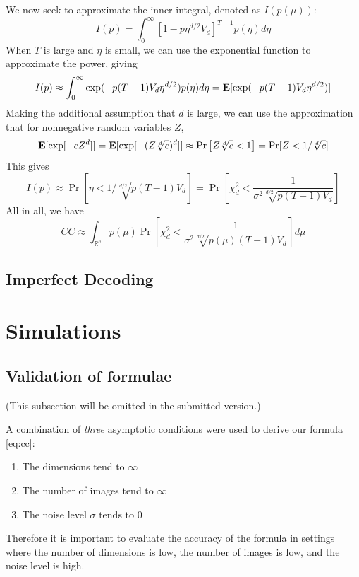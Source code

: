 \documentclass[11pt]{article}
\begin{document}
We now seek to approximate the inner integral, denoted as $I(p(\mu))$:
\[
I(p) = \int_0^\infty \left[1 - p \eta^{d/2} V_d \right]^{T-1} p(\eta) d\eta
\]
When $T$ is large and $\eta$ is small, we can use the exponential
function to approximate the power, giving
\[
I(p) \approx \int_0^\infty \exp(-p(T-1)V_d \eta^{d/2}) p(\eta) d\eta = \textbf{E}[\exp(-p(T-1) V_d \eta^{d/2})]
\]
Making the additional assumption that $d$ is large, we can use the approximation that for nonnegative random variables $Z$,
\[
\textbf{E}[\exp[-cZ^d]] = \textbf{E}[\exp[-(Z\sqrt[d]{c})^d]] \approx \Pr\left[Z \sqrt[d]{c} < 1\right] = \Pr[Z < 1/\sqrt[d]{c}]
\]
This gives
\begin{equation}\label{eq:ip}
I(p) \approx \Pr[\eta < 1/\sqrt[d/2]{p (T-1) V_d}] = \Pr\left[\chi^2_d < \frac{1}{\sigma^2 \sqrt[d/2]{p (T-1) V_d}}\right]
\end{equation}
All in all, we have
\begin{equation}\label{eq:cc}
CC \approx \int_\mathbb{R^d} p(\mu) \Pr\left[\chi^2_d < \frac{1}{\sigma^2 \sqrt[d/2]{p(\mu) (T-1) V_d}}\right] d\mu
\end{equation}

\subsection{Imperfect Decoding}

\section{Simulations}

\subsection{Validation of formulae}

(This subsection will be omitted in the submitted version.)

A combination of \emph{three} asymptotic conditions were used to
derive our formula \eqref{eq:cc}:
\begin{enumerate}
\item The dimensions tend to $\infty$
\item The number of images tend to $\infty$
\item The noise level $\sigma$ tends to 0
\end{enumerate}

Therefore it is important to evaluate the accuracy of the formula in
settings where the number of dimensions is low, the number of images
is low, and the noise level is high.
\end{document}
